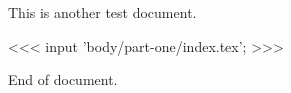 \documentclass[a4paper,10pt]{article}
\begin{document}
    This is another test document.

    <<< input 'body/part-one/index.tex'; >>>

    End of document.
\end{document}
